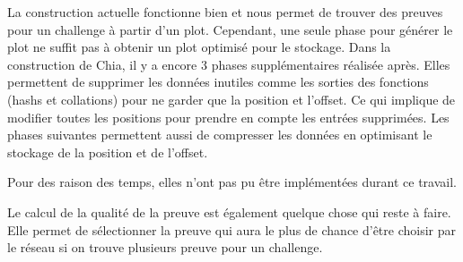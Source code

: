 La construction actuelle fonctionne bien et nous permet de trouver des preuves pour un challenge à partir d'un plot. Cependant, une seule phase pour générer le plot ne suffit pas à obtenir un plot optimisé pour le stockage. Dans la construction de Chia, il y a encore 3 phases supplémentaires réalisée après. Elles permettent de supprimer les données inutiles comme les sorties des fonctions (hashs et collations) pour ne garder que la position et l'offset. Ce qui implique de modifier toutes les positions pour prendre en compte les entrées supprimées. Les phases suivantes permettent aussi de compresser les données en optimisant le stockage de la position et de l'offset.

Pour des raison des temps, elles n'ont pas pu être implémentées durant ce travail.

Le calcul de la qualité de la preuve est également quelque chose qui reste à faire. Elle permet de sélectionner la preuve qui aura le plus de chance d'être choisir par le réseau si on trouve plusieurs preuve pour un challenge.